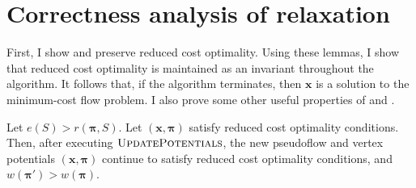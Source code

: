 \section{Correctness analysis of relaxation} \label{appendix:impl-relaxation-correctness}

First, I show  and  preserve reduced cost optimality. Using these lemmas, I show that reduced cost optimality is maintained as an invariant throughout the algorithm. It follows that, if the algorithm terminates, then $\mathbf{x}$ is a solution to the minimum-cost flow problem. I also prove some other useful properties of  and .\\

\begin{lemma} \label{lemma:relax-correctness-updatepotentials}
    Let $e(S) > r(\boldsymbol{\pi},S)$. Let $\left(\mathbf{x},\boldsymbol{\pi}\right)$ satisfy reduced cost optimality conditions. Then, after executing $\textproc{UpdatePotentials}$, the new pseudoflow and vertex potentials $\left(\mathbf{x},\boldsymbol{\pi}\right)$ continue to satisfy reduced cost optimality conditions, and $w(\boldsymbol{\pi}') > w(\boldsymbol{\pi})$.
\end{lemma}
